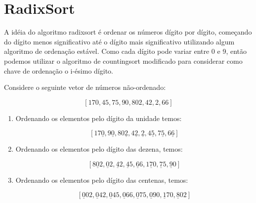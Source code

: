 \section{RadixSort}

A idéia do algoritmo radixsort é ordenar os números dígito por dígito, começando do dígito menos significativo até o dígito mais significativo utilizando algum algoritmo de ordenação estável. Como cada dígito pode variar entre 0 e 9, então podemos utilizar o algoritmo de countingsort modificado para considerar como chave de ordenação o i-ésimo dígito.

\begin{exemplo}
Considere o seguinte vetor de números não-ordenado:

$$[170,45,75,90,802,42,2,66]$$


\begin{enumerate}

\item Ordenando os elementos pelo dígito da unidade temos:

$$[17\underline{0}, 9\underline{0}, 80\underline{2}, 4\underline{2}, \underline{2}, 4\underline{5},7 \underline{5},6\underline{6}]$$

\item Ordenando os elementos pelo dígito das dezena, temos:

$$[8\underline{0}2, \underline{0}2, \underline{4}2, \underline{4}5, \underline{6}6,1\underline{7}0,\underline{7}5 ,\underline{9}0]$$

\item Ordenando os elementos pelo dígito das centenas, temos:

$$[\underline{0}02, \underline{0}42, \underline{0}45, \underline{0}66, \underline{0}75, \underline{0}90, \underline{1}70, \underline{8}02 ]$$

\end{enumerate}

\end{exemplo}



